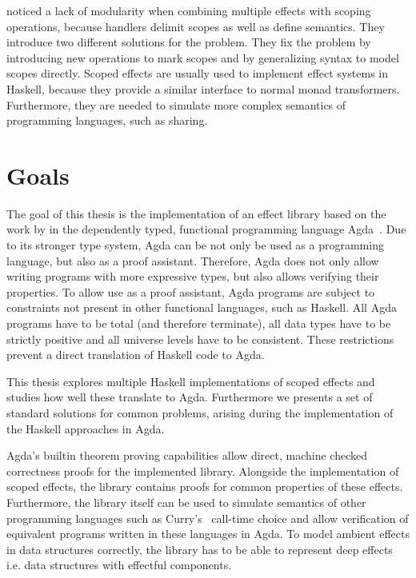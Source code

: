 \documentclass[10pt,a4paper,twoside,notitlepage]{report}
\begin{document}
\textcite{DBLP:conf/haskell/WuSH14} noticed a lack of modularity when
combining multiple effects with scoping operations, because handlers delimit
scopes as well as define semantics.
They introduce two different solutions for the problem.
They fix the problem by introducing new operations to mark scopes and by
generalizing syntax to model scopes directly.
Scoped effects are usually used to implement effect systems in Haskell, because
they provide a similar interface to normal monad transformers.
Furthermore, they are needed to simulate more complex semantics of programming
languages, such as sharing.


\section{Goals}

The goal of this thesis is the implementation of an effect library based on the
work by \textcite{DBLP:conf/haskell/WuSH14,DBLP:conf/lics/PirogSWJ18} in
the dependently typed, functional programming language
Agda~\cite{norell:thesis}.
Due to its stronger type system, Agda can be not only be used as a programming
language, but also as a proof assistant.
Therefore, Agda does not only allow writing programs with more expressive types,
but also allows verifying their properties.
To allow use as a proof assistant, Agda programs are subject to constraints not
present in other functional languages, such as Haskell.
All Agda programs have to be total (and therefore terminate), all data types
have to be strictly positive and all universe levels have to be consistent.
These restrictions prevent a direct translation of Haskell code to Agda.

This thesis explores multiple Haskell implementations of scoped effects and
studies how well these translate to Agda.
Furthermore we presents a set of standard solutions for common problems, arising
during the implementation of the Haskell approaches in Agda.

Agda's builtin theorem proving capabilities allow direct, machine checked
correctness proofs for the implemented library.
Alongside the implementation of scoped effects, the library contains proofs for
common properties of these effects.
Furthermore, the library itself can be used to simulate semantics of other
programming languages such as Curry's~\cite{Hanus95curry} call-time choice and
allow verification of equivalent programs written in these languages in Agda.
To model ambient effects in data structures correctly, the library has to be
able to represent deep effects i.e. data structures with effectful components.
\end{document}
